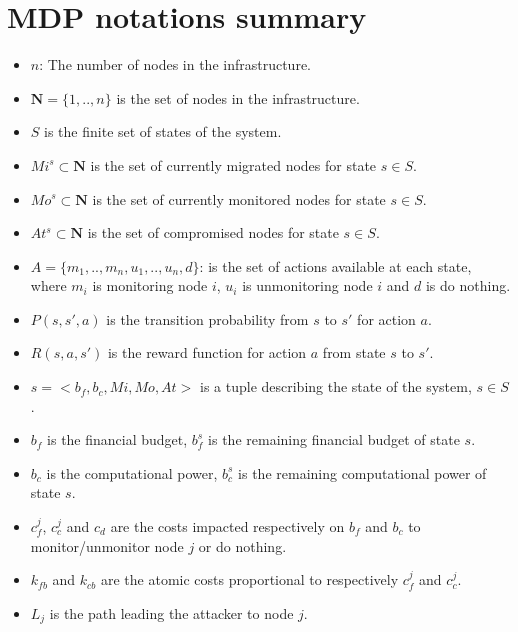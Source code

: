 \section{MDP notations summary}
\begin{itemize}
    \item $n$: The number of nodes in the infrastructure.
    \item $\textbf{N} = \{1,..,n\}$ is the set of nodes in the infrastructure.
    \item $S$ is the finite set of states of the system. 
    \item $Mi^s \subset \textbf{N} $ is the set of currently migrated nodes for state $s\in S$.
    \item $Mo^s \subset \textbf{N}$ is the set of currently monitored nodes for state $s\in S$.
    \item $At^s \subset \textbf{N}$ is the set of compromised nodes for state $s \in S$.
    \item $A = \{m_1,..,m_n,u_1,..,u_n,d\}$: is the set of actions available at each state, where $m_i$ is monitoring node $i$, $u_i$ is unmonitoring node $i$ and $d$ is do nothing.
    \item $P(s,s',a)$ is the transition probability from $s$ to $s'$ for action $a$.
    \item $R(s,a,s')$ is the reward function for action $a$ from state $s$ to $s'$.
    \item $s=<b_f,b_c,Mi,Mo,At>$ is a tuple describing the state of the system, $s\in S$.
    \item $b_f$ is the financial budget, $b_f^s$ is the remaining financial budget of state $s$.
    \item $b_c$ is the computational power, $b_c^s$ is the remaining computational power of state $s$.
    \item $c_f^j$, $c_c^j$ and $c_d$ are the costs impacted respectively on $b_f$ and $b_c$ to monitor/unmonitor node $j$ or do nothing.
    \item $k_{fb}$ and $k_{cb}$ are the atomic costs proportional to respectively $c_f^j$ and $c_c^j$.
    \item $L_j$ is the path leading the attacker to node $j$.

\end{itemize}
